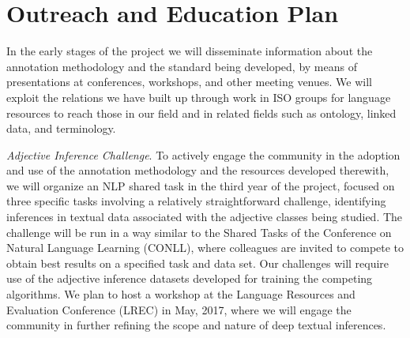 \documentclass[10pt]{article}
\begin{document}
\vspace {-4mm}
\section{Outreach and Education Plan}

\vspace {-3mm}



In the early stages of the project we will disseminate information about the annotation methodology and the standard being developed, by means of presentations at conferences, workshops, and other meeting venues. We will  exploit the relations we have built up through work in ISO groups for language resources to reach 
those in our field and
in related fields such as ontology, linked data, and terminology.  


{\it Adjective Inference Challenge}. To actively engage the community in the adoption and  use of the annotation methodology and the resources developed therewith, we will organize an  NLP shared task in the third year of the project,  focused on three specific tasks involving a relatively straightforward challenge,  identifying inferences in textual data associated with the adjective classes being studied. 
The challenge will be run in a way similar to the Shared Tasks of the Conference on Natural Language Learning (CONLL), where colleagues are invited to compete to obtain best results on a specified task and data set. Our challenges will require use of the adjective inference datasets developed for training the competing algorithms.  We plan to host a workshop at the Language Resources and Evaluation Conference (LREC) in May, 2017, where we will engage the community in further refining the scope and nature of deep textual inferences.
\end{document}
